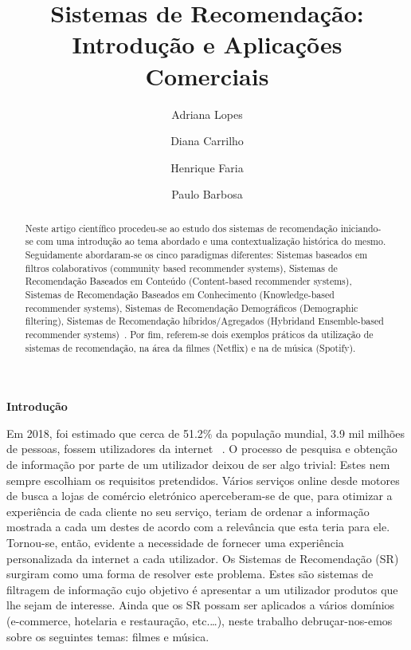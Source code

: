 %
\title{Sistemas de Recomendação: Introdução e Aplicações Comerciais}
%
%
\author{Adriana Lopes \and Diana Carrilho \and Henrique Faria \and Paulo Barbosa}
%
%
%
\maketitle              %
%
\begin{abstract}
Neste artigo científico procedeu-se ao estudo dos sistemas de recomendação iniciando-se com uma introdução ao tema abordado e uma contextualização histórica do mesmo. Seguidamente abordaram-se os cinco paradigmas diferentes: Sistemas baseados em filtros colaborativos (community based recommender systems), Sistemas de Recomendação Baseados em Conteúdo (Content-based recommender systems), Sistemas de Recomendação Baseados em Conhecimento
(Knowledge-based recommender systems), Sistemas de Recomendação Demográficos (Demographic filtering), Sistemas de Recomendação híbridos/Agregados (Hybridand Ensemble-based recommender systems)~\cite{ref_book1}. Por fim, referem-se dois exemplos práticos da utilização de sistemas de recomendação, na área da filmes (Netflix) e na de música (Spotify).\newline

\end{abstract}
%
%
\begin{center}
\normalsize{\bfseries Introdução}\hfill 
\end{center}
Em 2018, foi estimado que cerca de 51.2\% da população mundial, 3.9 mil milhões de pessoas, fossem utilizadores da internet~\cite{ref_url1} . O processo de pesquisa e obtenção de informação por parte de um utilizador deixou de ser algo trivial: Estes nem sempre escolhiam os requisitos pretendidos. Vários serviços online desde motores de busca a lojas de comércio eletrónico aperceberam-se de que, para otimizar a experiência de cada cliente no seu serviço, teriam de ordenar a informação mostrada a cada um destes de acordo com a relevância que esta teria para ele. Tornou-se, então, evidente a necessidade de fornecer uma experiência personalizada da internet a cada utilizador.  
Os Sistemas de Recomendação (SR) surgiram como uma forma de resolver este problema. Estes são sistemas de filtragem de informação cujo objetivo é apresentar a um utilizador produtos que lhe sejam de interesse. 
Ainda que os SR possam ser aplicados a vários domínios (e-commerce, hotelaria e restauração, etc.…), neste trabalho debruçar-nos-emos sobre os seguintes temas: filmes e música. 





